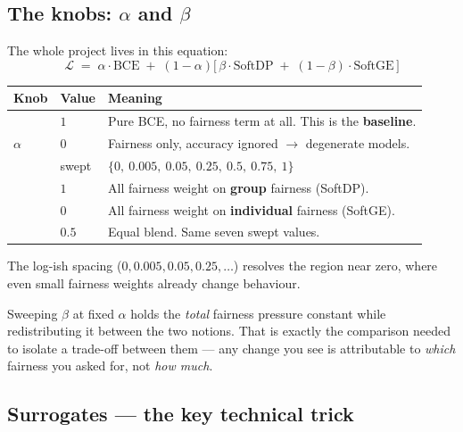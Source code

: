 \documentclass[11pt,a4paper]{article}
\begin{document}
\subsection{The knobs: \texorpdfstring{$\alpha$}{alpha} and
\texorpdfstring{$\beta$}{beta}}

The whole project lives in this equation:
\begin{equation}
\mathcal{L} \;=\; \alpha \cdot \mathrm{BCE}
\;+\; (1-\alpha)\Big[\,\beta \cdot \mathrm{SoftDP} \;+\; (1-\beta)\cdot \mathrm{SoftGE}\,\Big]
\label{eq:composite}
\end{equation}

\begin{center}
\small
\begin{tabular}{@{}llp{}@{}}
\toprule
\textbf{Knob} & \textbf{Value} & \textbf{Meaning} \\
\midrule
\multirow{3}{*}{$\alpha$}
 & $1$   & Pure BCE, no fairness term at all. This is the \textbf{baseline}. \\
 & $0$   & Fairness only, accuracy ignored $\to$ degenerate models. \\
 & swept & $\{0,\ 0.005,\ 0.05,\ 0.25,\ 0.5,\ 0.75,\ 1\}$ \\
\addlinespace
\multirow{3}{*}{$\beta$}
 & $1$   & All fairness weight on \textbf{group} fairness (SoftDP). \\
 & $0$   & All fairness weight on \textbf{individual} fairness (SoftGE). \\
 & $0.5$ & Equal blend. Same seven swept values. \\
\bottomrule
\end{tabular}
\end{center}

The log-ish spacing ($0, 0.005, 0.05, 0.25, \ldots$) resolves the region near
zero, where even small fairness weights already change behaviour.

\begin{keybox}
Sweeping $\beta$ at fixed $\alpha$ holds the \emph{total} fairness pressure
constant while redistributing it between the two notions. That is exactly the
comparison needed to isolate a trade-off between them --- any change you see is
attributable to \emph{which} fairness you asked for, not \emph{how much}.
\end{keybox}

\subsection{Surrogates --- the key technical trick}
\end{document}
